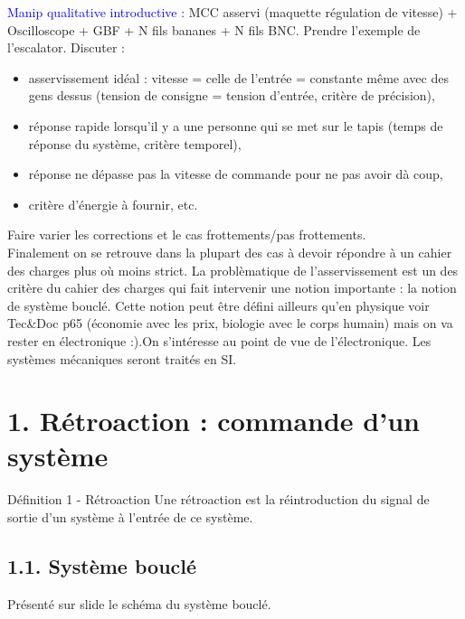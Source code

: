 \documentclass[french, a4paper, 10pt, twocolumn, landscape]{article}
\begin{document}
\textcolor{blue}{Manip qualitative introductive :} MCC asservi (maquette régulation de vitesse) + Oscilloscope + GBF + N fils bananes + N fils BNC. Prendre l'exemple de l'escalator. Discuter : 
\begin{itemize}
    \item asservissement idéal : vitesse = celle de l'entrée = constante même avec des gens dessus (tension de consigne = tension d'entrée, critère de précision),
    \item réponse rapide lorsqu'il y a une personne qui se met sur le tapis (temps de réponse du système, critère temporel),
    \item réponse ne dépasse pas la vitesse de commande pour ne pas avoir dà coup,
    \item critère d'énergie à fournir, etc.
\end{itemize}
Faire varier les corrections et le cas frottements/pas frottements.\\

Finalement on se retrouve dans la plupart des cas à devoir répondre à un cahier des charges plus où moins strict. La problèmatique de l'asservissement est un des critère du cahier des charges qui fait intervenir une notion importante : la notion de système bouclé. Cette notion peut être défini ailleurs qu'en physique voir Tec\&Doc p65 (économie avec les prix, biologie avec le corps humain) mais on va rester en électronique :).On s'intéresse au point de vue de l'électronique. Les systèmes mécaniques seront traités en SI.

\section*{1. Rétroaction : commande d'un système }

\begin{definition}{Définition 1 - Rétroaction}
  Une rétroaction est la réintroduction du signal de sortie d'un système à l'entrée de ce système.

\end{definition}
\subsection*{1.1. Système bouclé}

Présenté sur slide le schéma du système bouclé. 
\end{document}
